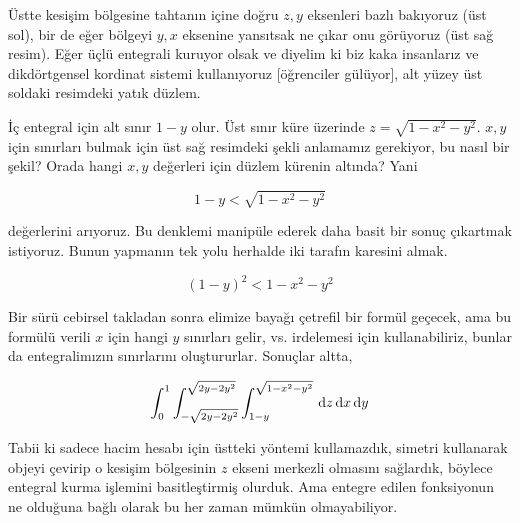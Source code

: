 \documentclass[12pt,fleqn]{article}\usepackage{../../common}
\begin{document}
Üstte kesişim bölgesine tahtanın içine doğru $z,y$ eksenleri bazlı
bakıyoruz (üst sol), bir de eğer bölgeyi $y,x$ eksenine yansıtsak ne çıkar
onu görüyoruz (üst sağ resim). Eğer üçlü entegrali kuruyor olsak ve diyelim
ki biz kaka insanlarız ve dikdörtgensel kordinat sistemi kullanıyoruz
[öğrenciler gülüyor], alt yüzey üst soldaki resimdeki yatık düzlem. 

İç entegral için alt sınır $1-y$ olur. Üst sınır küre üzerinde
$z = \sqrt{1-x^2-y^2}$. $x,y$ için sınırları bulmak için üst sağ resimdeki
şekli anlamamız gerekiyor, bu nasıl bir şekil? Orada hangi $x,y$ değerleri
için düzlem kürenin altında? Yani 

$$ 1-y < \sqrt{1-x^2-y^2} $$

değerlerini arıyoruz. Bu denklemi manipüle ederek daha basit bir sonuç
çıkartmak istiyoruz. Bunun yapmanın tek yolu herhalde iki tarafın karesini
almak. 

$$ (1-y)^2 < 1-x^2-y^2 $$

Bir sürü cebirsel takladan sonra elimize bayağı çetrefil bir formül
geçecek, ama bu formülü verili $x$ için hangi $y$ sınırları gelir,
vs. irdelemesi için kullanabiliriz, bunlar da entegralimızın sınırlarını
oluştururlar. Sonuçlar altta,

$$ 
\int _{0}^{1} 
\int _{-\sqrt{2y-2y^2}}^{\sqrt{2y-2y^2}} 
\int _{1-y}^{\sqrt{1-x^2-y^2}}
\,\mathrm{d} z \,\mathrm{d} x \,\mathrm{d} y
$$

Tabii ki sadece hacim hesabı için üstteki yöntemi kullamazdık, simetri
kullanarak objeyi çevirip o kesişim bölgesinin $z$ ekseni merkezli olmasını
sağlardık, böylece entegral kurma işlemini basitleştirmiş olurduk. Ama
entegre edilen fonksiyonun ne olduğuna bağlı olarak bu her zaman mümkün
olmayabiliyor. 
\end{document}
